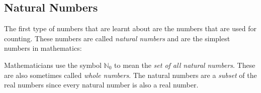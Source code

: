             \subsection{ Natural Numbers}
            \nopagebreak
        \label{m38346*id178423}The first type of numbers that are learnt about are the numbers that are used
for counting. These numbers are called \textsl{natural numbers} and are the
simplest numbers in mathematics:\par 
        \label{m38346*uid55}\nopagebreak\noindent{}
        \label{m38346*id178472}Mathematicians use the symbol ${\mathbb{N}}_{0}$ to mean the \textsl{set of all natural
numbers}. These are also sometimes called \textsl{whole numbers}. The natural numbers are a \textsl{subset} of the real numbers since
every natural number is also a real number.\par 
      \label{m38346*uid56}
